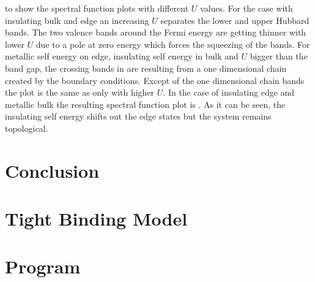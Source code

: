 \documentclass[a4paper,11pt]{report}
\begin{document}
 to  show the spectral function plots with
different $U$ values. For the case with insulating bulk and edge an increasing $U$ separates the lower and upper Hubbard
bands. The two valence bands around the Fermi energy are getting thinner with lower $U$ due to a pole at zero energy
which forces the squeezing of the bands. For metallic self energy on edge, insulating self energy in bulk and $U$ bigger 
than the band gap, the crossing bands in  are resulting from a one dimensional
chain created by the boundary conditions. Except of the one dimensional chain bands the plot is the same as 
 only with higher $U$. In the case of insulating edge and metallic bulk the resulting
spectral function plot is . As it can be seen, the insulating self energy shifts out 
the edge states but the system remains topological.


\chapter{Conclusion}

\appendix

\chapter{Tight Binding Model}\label{a:tb}
\chapter{Program}\label{a:program}

\printbibliography
\end{document}
